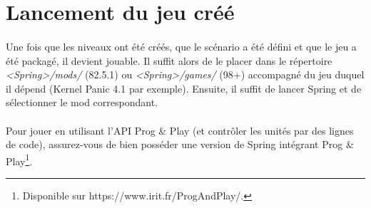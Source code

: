 \documentclass[a4paper]{article}
\begin{document}
\section{Lancement du jeu créé}
\paragraph{ }
Une fois que les niveaux ont été créés, que le scénario a été défini et que le jeu a été packagé, il devient jouable. Il suffit alors de le placer dans le répertoire \textit{<Spring>/mods/} (82.5.1) ou \textit{<Spring>/games/} (98+) accompagné du jeu duquel il dépend (Kernel Panic 4.1 par exemple). Ensuite, il suffit de lancer Spring et de sélectionner le mod correspondant.
\paragraph{ }
Pour jouer en utilisant l'API Prog \& Play (et contrôler les unités par des lignes de code), assurez-vous de bien posséder une version de Spring intégrant Prog \& Play\footnote{Disponible sur https://www.irit.fr/ProgAndPlay/.}.
\end{document}
